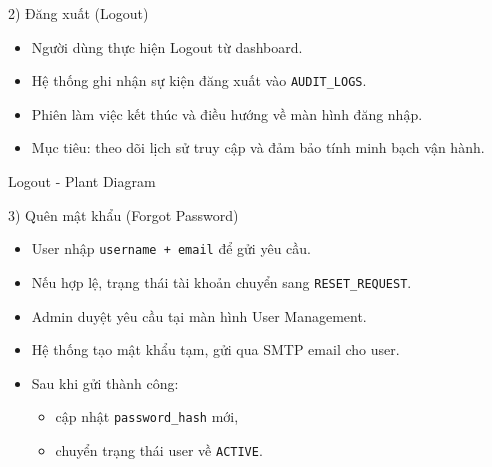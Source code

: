\documentclass[aspectratio=169]{beamer}
\begin{document}
\begin{frame}{2) Đăng xuất (Logout)}
\begin{itemize}
  \item Người dùng thực hiện Logout từ dashboard.
  \item Hệ thống ghi nhận sự kiện đăng xuất vào \texttt{AUDIT\_LOGS}.
  \item Phiên làm việc kết thúc và điều hướng về màn hình đăng nhập.
  \item Mục tiêu: theo dõi lịch sử truy cập và đảm bảo tính minh bạch vận hành.
\end{itemize}
\end{frame}

\begin{frame}{Logout - Plant Diagram}
\centering
{}
\end{frame}

\begin{frame}{3) Quên mật khẩu (Forgot Password)}
\begin{itemize}
  \item User nhập \texttt{username + email} để gửi yêu cầu.
  \item Nếu hợp lệ, trạng thái tài khoản chuyển sang \texttt{RESET\_REQUEST}.
  \item Admin duyệt yêu cầu tại màn hình User Management.
  \item Hệ thống tạo mật khẩu tạm, gửi qua SMTP email cho user.
  \item Sau khi gửi thành công:
  \begin{itemize}
    \item cập nhật \texttt{password\_hash} mới,
    \item chuyển trạng thái user về \texttt{ACTIVE}.
  \end{itemize}
\end{itemize}
\end{frame}
\end{document}

